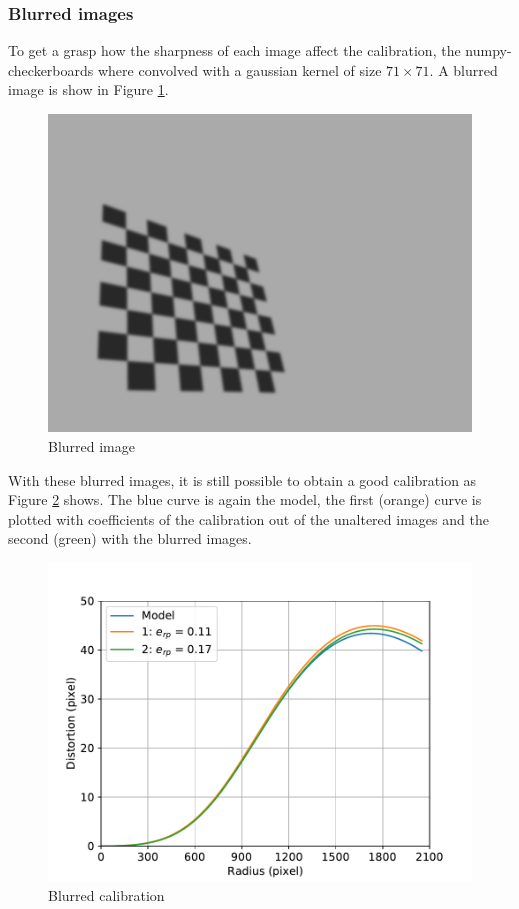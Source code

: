 \subsubsection{Blurred images}
To get a grasp how the sharpness of each image affect the calibration, the numpy-checkerboards where convolved with a gaussian kernel of size $71\times 71$.
A blurred image is show in Figure \ref{development:nump_blurred}.
\begin{figure}[ht]
	\centering
	\includegraphics[width=0.9\linewidth]{3-development/calibration/images/nump1_blurred.png}
	\caption{Blurred image\label{development:nump_blurred}}
\end{figure}
With these blurred images, it is still possible to obtain a good calibration as Figure \ref{development:blurred} shows.
The blue curve is again the model, the first (orange) curve is plotted with coefficients of the calibration out of the unaltered images and the second (green) with the blurred images.
\begin{figure}[ht]
	\centering
	\includegraphics[width=0.9\linewidth]{3-development/calibration/images/blurred.pdf}
	\caption{Blurred calibration\label{development:blurred}}
\end{figure}
